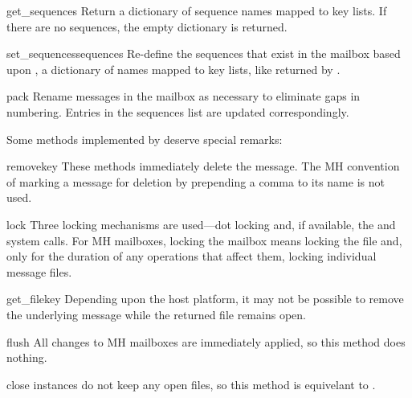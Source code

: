 \begin{methoddesc}{get_sequences}{}
Return a dictionary of sequence names mapped to key lists. If there are no
sequences, the empty dictionary is returned.
\end{methoddesc}

\begin{methoddesc}{set_sequences}{sequences}
Re-define the sequences that exist in the mailbox based upon , a
dictionary of names mapped to key lists, like returned by
.
\end{methoddesc}

\begin{methoddesc}{pack}{}
Rename messages in the mailbox as necessary to eliminate gaps in numbering.
Entries in the sequences list are updated correspondingly. 
\end{methoddesc}

Some  methods implemented by  deserve special remarks:

\begin{methoddesc}{remove}{key}
These methods immediately delete the message. The MH convention of marking a
message for deletion by prepending a comma to its name is not used.
\end{methoddesc}

\begin{methoddesc}{lock}{}
Three locking mechanisms are used---dot locking and, if available, the
 and  system calls. For MH mailboxes,
locking the mailbox means locking the  file and, only for
the duration of any operations that affect them, locking individual message
files.
\end{methoddesc}

\begin{methoddesc}{get_file}{key}
Depending upon the host platform, it may not be possible to remove the
underlying message while the returned file remains open.
\end{methoddesc}

\begin{methoddesc}{flush}{}
All changes to MH mailboxes are immediately applied, so this method does
nothing.
\end{methoddesc}

\begin{methoddesc}{close}{}
 instances do not keep any open files, so this method is equivelant
to .
\end{methoddesc}

